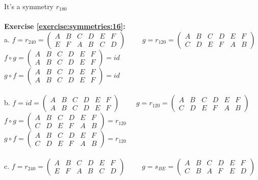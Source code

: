 It's a symmetry $r_{180}$\\
\\
\textbf{Exercise \ref{exercise:symmetries:16}:}\\
a. $f=r_{240}=\begin{pmatrix}
A & B & C & D & E & F\\
E & F & A & B & C & D
\end{pmatrix}$
$\qquad g=r_{120}=\begin{pmatrix}
A & B & C & D & E & F\\
C & D & E & F & A & B
\end{pmatrix}$\\
$f\circ g=\begin{pmatrix}
A & B & C & D & E & F\\
A & B & C & D & E & F
\end{pmatrix}=id$\\
$g\circ f=\begin{pmatrix}
A & B & C & D & E & F\\
A & B & C & D & E & F
\end{pmatrix}=id$\\
\\
b. $f=id=\begin{pmatrix}
A & B & C & D & E & F\\
A & B & C & D & E & F
\end{pmatrix}$
$\qquad g=r_{120}=\begin{pmatrix}
A & B & C & D & E & F\\
C & D & E & F & A & B
\end{pmatrix}$\\
$f\circ g=\begin{pmatrix}
A & B & C & D & E & F\\
C & D & E & F & A & B
\end{pmatrix}=r_{120}$\\
$g\circ f=\begin{pmatrix}
A & B & C & D & E & F\\
C & D & E & F & A & B
\end{pmatrix}=r_{120}$\\
\\
c. $f=r_{240}=\begin{pmatrix}
A & B & C & D & E & F\\
E & F & A & B & C & D
\end{pmatrix}$
$\qquad g=s_{BE}=\begin{pmatrix}
A & B & C & D & E & F\\
C & B & A & F & E & D
\end{pmatrix}$\\
